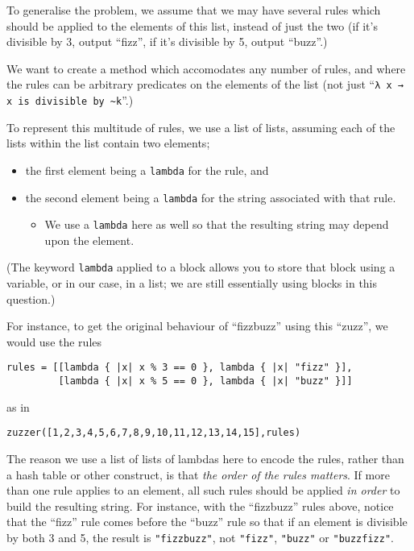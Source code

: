 \documentclass[11pt]{article}
\begin{document}
To generalise the problem, we assume that we may have
several rules which should be applied to the elements of this list,
instead of just the two (if it's divisible by 3, output “fizz”,
if it's divisible by 5, output “buzz”.)

We want to create a method which accomodates any number of rules,
and where the rules can be arbitrary predicates
on the elements of the list
(not just “\texttt{λ x → x is divisible by \textasciitilde{}k}”.)

To represent this multitude of rules, we use a list of lists,
assuming each of the lists within the list contain two elements;
\begin{itemize}
\item the first element being a \texttt{lambda} for the rule, and
\item the second element being a \texttt{lambda} for the string
associated with that rule.
\begin{itemize}
\item We use a \texttt{lambda} here as well so that the resulting string
may depend upon the element.
\end{itemize}
\end{itemize}

(The keyword \texttt{lambda} applied to a block allows you to store
that block using a variable, or in our case, in a list;
we are still essentially using blocks in this question.)

For instance, to get the original behaviour of “fizzbuzz”
using this “zuzz”, we would use the rules
\begin{verbatim}
rules = [[lambda { |x| x % 3 == 0 }, lambda { |x| "fizz" }],
         [lambda { |x| x % 5 == 0 }, lambda { |x| "buzz" }]]
\end{verbatim}
as in
\begin{verbatim}
zuzzer([1,2,3,4,5,6,7,8,9,10,11,12,13,14,15],rules)
\end{verbatim}

The reason we use a list of lists of lambdas here to encode the rules,
rather than a hash table or other construct,
is that \emph{the order of the rules matters}.
If more than one rule applies to an element, all such rules
should be applied \emph{in order} to build the resulting string.
For instance, with the “fizzbuzz” rules above, notice
that the “fizz” rule comes before the “buzz” rule
so that if an element is divisible by both 3 and 5,
the result is \texttt{"fizzbuzz"}, not \texttt{"fizz"}, \texttt{"buzz"} or \texttt{"buzzfizz"}.
\end{document}

